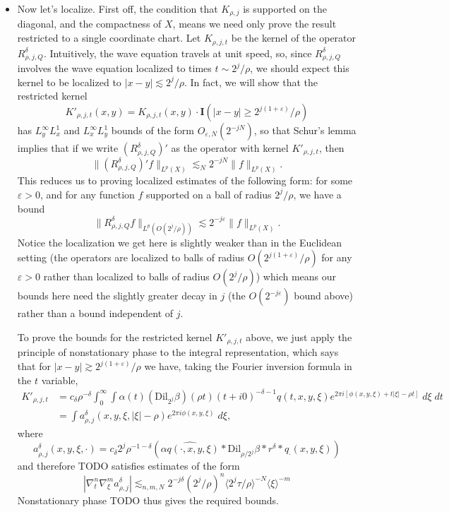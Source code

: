 \begin{itemize}
    \item Now let's localize. First off, the condition that $K_{\rho,j}$ is supported on the diagonal, and the compactness of $X$, means we need only prove the result restricted to a single coordinate chart. Let $K_{\rho,j,t}$ be the kernel of the operator $R^\delta_{\rho,j,Q}$. Intuitively, the wave equation travels at unit speed, so, since $R^\delta_{\rho,j,Q}$ involves the wave equation localized to times $t \sim 2^j / \rho$, we should expect this kernel to be localized to $|x - y| \lesssim 2^j / \rho$. In fact, we will show that the restricted kernel
    \[ K'_{\rho,j,t}(x,y) = K_{\rho,j,t}(x,y) \cdot \mathbf{I}(|x - y| \geq 2^{j(1 + \varepsilon)} / \rho) \]
    has $L^\infty_y L^1_x$ and $L^\infty_x L^1_y$ bounds of the form $O_{\varepsilon,N}(2^{-jN})$, so that Schur's lemma implies that if we write $(R^\delta_{\rho,j,Q})'$ as the operator with kernel $K'_{\rho,j,t}$, then
    \[ \| (R^\delta_{\rho,j,Q})' f \|_{L^p(X)} \lesssim_N 2^{-jN} \| f \|_{L^p(X)}. \]
    This reduces us to proving localized estimates of the following form: for some $\varepsilon > 0$, and for any function $f$ supported on a ball of radius $2^j / \rho$, we have a bound
    \[ \| R^\delta_{\rho,j,Q} f \|_{L^p( O(2^j / \rho) )} \lesssim 2^{-j \varepsilon} \| f \|_{L^p(X)}. \]
    Notice the localization we get here is slightly weaker than in the Euclidean setting (the operators are localized to balls of radius $O(2^{j(1 + \varepsilon)} / \rho)$ for any $\varepsilon > 0$ rather than localized to balls of radius $O(2^j / \rho)$) which means our bounds here need the slightly greater decay in $j$ (the $O(2^{-j \varepsilon})$ bound above) rather than a bound independent of $j$.

    To prove the bounds for the restricted kernel $K'_{\rho,j,t}$ above, we just apply the principle of nonstationary phase to the integral representation, which says that for $|x - y| \gtrsim 2^{j(1+\varepsilon)} / \rho$ we have, taking the Fourier inversion formula in the $t$ variable,
    \begin{align*}
        K'_{\rho,j,t} &= c_\delta \rho^{-\delta} \int_0^\infty \int \alpha(t) (\text{Dil}_{2^j} \beta)(\rho t) (t + i0)^{-\delta - 1} q(t,x,y,\xi) e^{2 \pi i [\phi(x,y,\xi) + t |\xi| - \rho t]}\; d\xi\; dt\\
        &= \int a^\delta_{\rho,j}(x,y,\xi,|\xi| - \rho) e^{2 \pi i \phi(x,y,\xi)}\; d\xi,
    \end{align*}
    where
    \[ a^\delta_{\rho,j}(x,y,\xi,\cdot) = c_\delta 2^j \rho^{-1-\delta} (\widehat{\alpha q(\cdot, x,y,\xi)} * \text{Dil}_{\rho / 2^j} \beta * r^\delta * q_{\cdot} (x,y,\xi)) \]
    and therefore TODO satisfies estimates of the form
    \[ |\nabla^n_t \nabla^m_\xi a^\delta_{\rho,j}| \lesssim_{n,m,N} 2^{-j \delta} (2^j / \rho)^n \langle 2^j \tau / \rho \rangle^{-N} \langle\xi \rangle^{-m} \]
    Nonstationary phase TODO thus gives the required bounds.


\end{itemize}
